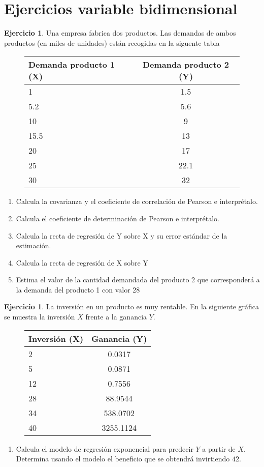 \documentclass[]{article}
\theoremstyle{plain}
\theoremstyle{definition}
\newtheorem{exercise}[theorem]{Ejercicio}
\theoremstyle{definition} %
\begin{document}
\section{Ejercicios variable bidimensional}


\begin{exercise}
  Una empresa fabrica dos productos. Las demandas de ambos productos (en miles de unidades) están recogidas en la siguente tabla
\begin{figure}
  \centering
  \begin{tabular}{lc}
    Demanda producto 1 (X) & Demanda producto 2 (Y)\\
    \hline
    1 & 1.5    \\
    5.2 & 5.6  \\  
    10 & 9     \\
    15.5 & 13  \\ 
    20 & 17    \\
    25 & 22.1  \\  
    30 & 32    
  \end{tabular}
\end{figure}
\begin{enumerate}
  \item
  Calcula la covarianza y el coeficiente de correlación de Pearson e
  interprétalo.

\item Calcula el coeficiente de determinación de Pearson e interprétalo.
\item
  Calcula la recta de regresión de Y sobre X y su error estándar de la estimación.
\item
  Calcula la recta de regresión de X sobre Y
\item
  Estima el valor de la cantidad demandada del producto 2 que corresponderá a la demanda del producto 1 con valor 28
\end{enumerate}
\end{exercise}


\begin{exercise}
  La inversión en un producto es muy rentable. En la siguiente gráfica se muestra la inversión $X$ frente a la ganancia $Y$. 
\begin{figure}
  \centering
  \begin{tabular}{lc}
    Inversión (X) & Ganancia (Y)\\
    \hline
    2 &  0.0317   \\
    5 &  0.0871   \\
    12&  0.7556   \\
    28&  88.9544  \\
    34&  538.0702 \\
    40&  3255.1124\\  
  \end{tabular}
\end{figure}
\begin{enumerate}
  \item Calcula el modelo de regresión exponencial para predecir $Y$ a partir de $X$. Determina usando el modelo el beneficio que 
  se obtendrá invirtiendo $42$.
\end{enumerate}
\end{exercise}
\end{document}
